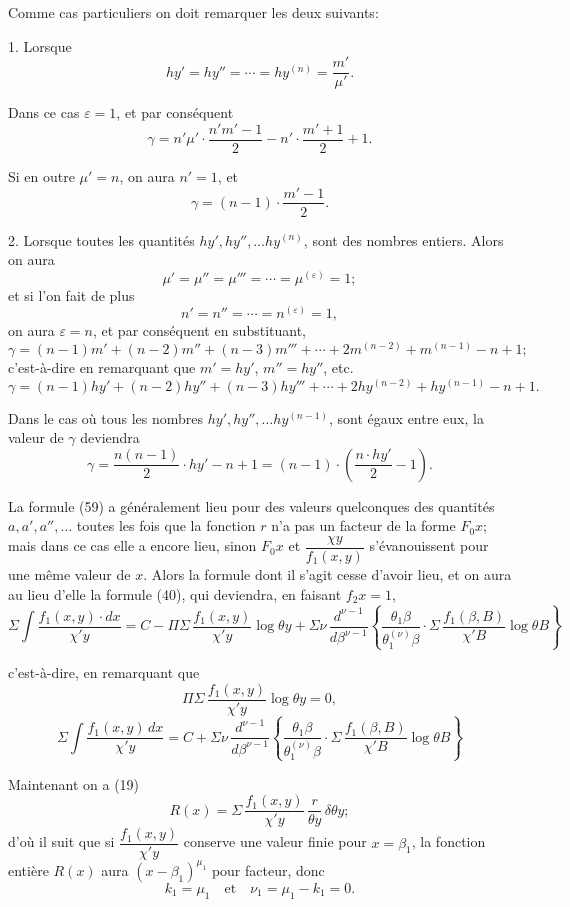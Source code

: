 \documentclass{article}
\begin{document}
Comme cas particuliers on doit remarquer les deux suivants:

1. Lorsque
\[ hy' = hy'' = \cdots = hy^{(n)} = \frac{m'}{\mu'}. \]

Dans ce cas $\varepsilon = 1$, et par conséquent
\[ \gamma = n'\mu' \cdot \frac{n'm'-1}{2} - n' \cdot \frac{m'+1}{2} + 1. \tag{63} \]

Si en outre $\mu' = n$, on aura $n' = 1$, et
\[ \gamma = (n-1) \cdot \frac{m'-1}{2}. \tag{64} \]

2. Lorsque toutes les quantités $hy', hy'', \ldots hy^{(n)}$, sont des nombres entiers. Alors on aura
\[ \mu' = \mu'' = \mu''' = \cdots = \mu^{(\varepsilon)} = 1; \]
et si l'on fait de plus
\[ n' = n'' = \cdots = n^{(\varepsilon)} = 1, \]
on aura $\varepsilon = n$, et par conséquent en substituant,
\[ \gamma = (n-1)m' + (n-2)m'' + (n-3)m''' + \cdots + 2m^{(n-2)} + m^{(n-1)} - n + 1; \]
c'est-à-dire en remarquant que $m' = hy'$, $m'' = hy''$, etc.
\[ \gamma = (n-1)hy' + (n-2)hy'' + (n-3)hy''' + \cdots + 2hy^{(n-2)} + hy^{(n-1)} - n + 1. \tag{66} \]

Dans le cas où tous les nombres $hy', hy'', \ldots hy^{(n-1)}$, sont égaux entre eux, la valeur de $\gamma$ deviendra
\[ \gamma = \frac{n(n-1)}{2} \cdot hy' - n + 1 = (n-1) \cdot \left( \frac{n \cdot hy'}{2} - 1 \right). \tag{67} \]

La formule (59) a généralement lieu pour des valeurs quelconques des quantités $a, a', a'', \ldots$ toutes les fois que la fonction $r$ n'a pas un facteur de la forme $F_0 x$; mais dans ce cas elle a encore lieu, sinon $F_0 x$ et $\dfrac{\chi y}{f_1(x,y)}$ s'évanouissent pour une même valeur de $x$. Alors la formule dont il s'agit cesse d'avoir lieu, et on aura au lieu d'elle la formule (40), qui deviendra, en faisant $f_2 x = 1$,
\[ \Sigma\int \frac{f_1(x, y) \cdot dx}{\chi' y} = C - \Pi\Sigma\,\frac{f_1(x, y)}{\chi' y}\log\theta y + \Sigma\nu\,\frac{d^{\nu-1}}{d\beta^{\nu-1}} \left\{ \frac{\theta_1\beta}{\theta_1^{(\nu)}\beta} \cdot \Sigma\,\frac{f_1(\beta, B)}{\chi' B}\log\theta B \right\} \tag{68} \]

c'est-à-dire, en remarquant que
\[ \Pi\Sigma\,\frac{f_1(x, y)}{\chi' y}\log\theta y = 0, \]
\[ \Sigma\int \frac{f_1(x, y)\,dx}{\chi' y} = C + \Sigma\nu\,\frac{d^{\nu-1}}{d\beta^{\nu-1}} \left\{ \frac{\theta_1\beta}{\theta_1^{(\nu)}\beta} \cdot \Sigma\,\frac{f_1(\beta, B)}{\chi' B}\log\theta B \right\} \tag{69} \]

Maintenant on a (19)
\[ R(x) = \Sigma\,\frac{f_1(x, y)}{\chi' y}\,\frac{r}{\theta y}\,\delta\theta y; \]
d'où il suit que si $\dfrac{f_1(x,y)}{\chi' y}$ conserve une valeur finie pour $x = \beta_1$, la fonction entière $R(x)$ aura $(x-\beta_1)^{\mu_1}$ pour facteur, donc
\[ k_1 = \mu_1 \quad \text{et} \quad \nu_1 = \mu_1 - k_1 = 0. \]
\end{document}
